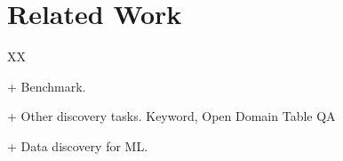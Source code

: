 \section{Related Work}
XX

+ Benchmark.

+ Other discovery tasks. Keyword, Open Domain Table QA

+ Data discovery for ML.